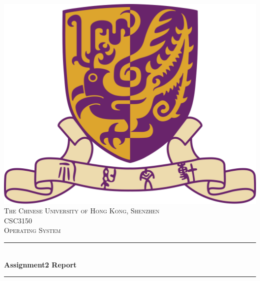 \documentclass[12pt,a4paper]{report}
\begin{document}
\begin{titlepage}

    \newcommand{\HRule}{\rule{\linewidth}{0.5mm}}

    \center


    \includegraphics[scale=.2]{src/cuhk.png}\\[1cm]
    \textsc{\large The Chinese University of Hong Kong, Shenzhen}\\[1.5cm]

    \textsc{\Large CSC3150}\\[0.5cm]

    \textsc{\large Operating System}\\[0.5cm]


    \HRule \\[0.4cm]
    { \huge \bfseries Assignment2 Report}
    \HRule \\[1.5cm]



\end{titlepage}
\end{document}

